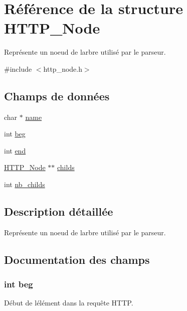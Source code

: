 \hypertarget{struct_h_t_t_p___node}{}\section{Référence de la structure H\+T\+T\+P\+\_\+\+Node}
\label{struct_h_t_t_p___node}


Représente un noeud de l\textquotesingle{}arbre utilisé par le parseur.  




{\ttfamily \#include $<$http\+\_\+node.\+h$>$}

\subsection*{Champs de données}
\begin{DoxyCompactItemize}
\item 
char $\ast$ \hyperlink{struct_h_t_t_p___node_a5ac083a645d964373f022d03df4849c8}{name}
\item 
int \hyperlink{struct_h_t_t_p___node_a19beace253d05f90e1cb466800398ef3}{beg}
\item 
int \hyperlink{struct_h_t_t_p___node_abce9f5dc9c83f2639b72024fdee5d388}{end}
\item 
\hyperlink{struct_h_t_t_p___node}{H\+T\+T\+P\+\_\+\+Node} $\ast$$\ast$ \hyperlink{struct_h_t_t_p___node_ab6c4f7b695ae0ff1af4af91419340f98}{childs}
\item 
int \hyperlink{struct_h_t_t_p___node_a7ef173e87af6384077b245308271482d}{nb\+\_\+childs}
\end{DoxyCompactItemize}


\subsection{Description détaillée}
Représente un noeud de l\textquotesingle{}arbre utilisé par le parseur. 

\subsection{Documentation des champs}
\subsubsection[{\texorpdfstring{beg}{beg}}]{\setlength{\rightskip}{0pt plus 5cm}int beg}\hypertarget{struct_h_t_t_p___node_a19beace253d05f90e1cb466800398ef3}{}\label{struct_h_t_t_p___node_a19beace253d05f90e1cb466800398ef3}
Début de l\textquotesingle{}élément dans la requête H\+T\+TP. 
